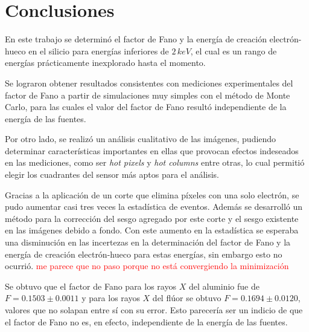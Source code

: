 \chapter{Conclusiones}
\noindent En este trabajo se determinó el factor de Fano y la energía de creación electrón-hueco en el silicio para energías inferiores de $2\,\si{keV}$, el cual es un rango de energías prácticamente inexplorado hasta el momento.


Se lograron obtener resultados consistentes con mediciones experimentales del factor de Fano a partir de simulaciones muy simples con el método de Monte Carlo, para las cuales el valor del factor de Fano resultó independiente de la energía de las fuentes.

Por otro lado, se realizó un análisis cualitativo de las imágenes, pudiendo determinar características importantes en ellas que provocan efectos indeseados en las mediciones, como ser \textit{hot pixels} y \textit{hot columns} entre otras, lo cual permitió elegir los cuadrantes del sensor más aptos para el análisis.

Gracias a la aplicación de un corte que elimina píxeles con una solo electrón, se pudo aumentar casi tres veces la estadística de eventos. Además se desarrolló un método para la corrección del sesgo agregado por este corte y el sesgo existente en las imágenes debido a fondo. Con este aumento en la estadística se esperaba una disminución en las incertezas en la determinación del factor de Fano y la energía de creación electrón-hueco para estas energías, sin embargo esto no ocurrió.
 \textcolor{red}{me parece que no paso porque no está convergiendo la minimización}

Se obtuvo que el factor de Fano para los rayos $X$ del aluminio fue de $F = 0.1503 \pm 0.0011$ y para los rayos $X$ del flúor se obtuvo $F = 0.1694 \pm 0.0120$, valores que no solapan entre sí con su error. Esto parecería ser un indicio de que el factor de Fano no es, en efecto, independiente de la energía de las fuentes.

